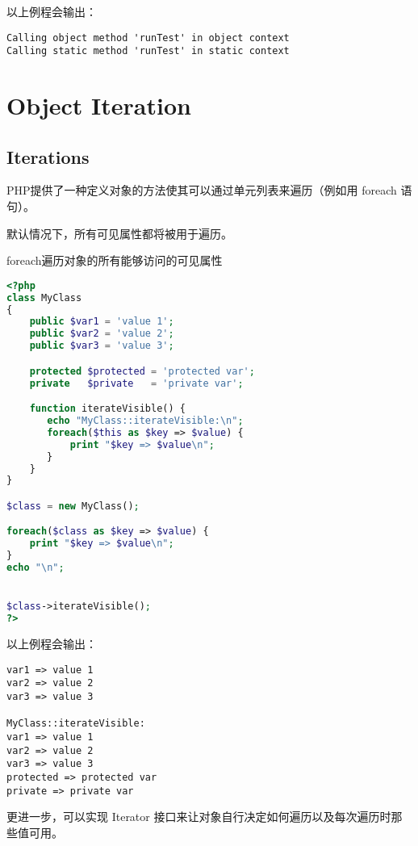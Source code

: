 以上例程会输出：

\begin{verbatim}
Calling object method 'runTest' in object context
Calling static method 'runTest' in static context
\end{verbatim}


\chapter{Object Iteration}


\section{Iterations}


PHP提供了一种定义对象的方法使其可以通过单元列表来遍历（例如用 foreach 语句）。

默认情况下，所有可见属性都将被用于遍历。

\begin{example}
foreach遍历对象的所有能够访问的可见属性
\begin{lstlisting}[language=PHP]
<?php
class MyClass
{
    public $var1 = 'value 1';
    public $var2 = 'value 2';
    public $var3 = 'value 3';

    protected $protected = 'protected var';
    private   $private   = 'private var';

    function iterateVisible() {
       echo "MyClass::iterateVisible:\n";
       foreach($this as $key => $value) {
           print "$key => $value\n";
       }
    }
}

$class = new MyClass();

foreach($class as $key => $value) {
    print "$key => $value\n";
}
echo "\n";


$class->iterateVisible();
?>
\end{lstlisting}
\end{example}

以上例程会输出：

\begin{verbatim}
var1 => value 1
var2 => value 2
var3 => value 3

MyClass::iterateVisible:
var1 => value 1
var2 => value 2
var3 => value 3
protected => protected var
private => private var
\end{verbatim}


更进一步，可以实现 Iterator 接口来让对象自行决定如何遍历以及每次遍历时那些值可用。


